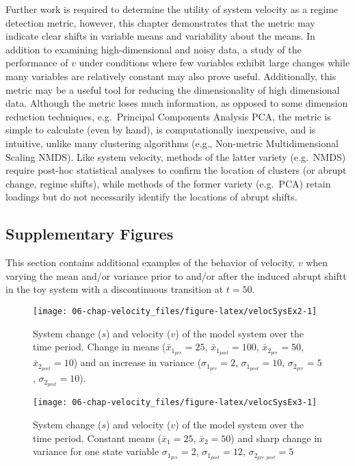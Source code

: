 \documentclass[]{article}
\begin{document}
Further work is required to determine the utility of system velocity as
a regime detection metric, however, this chapter demonstrates that the
metric may indicate clear shifts in variable means and variability about
the means. In addition to examining high-dimensional and noisy data, a
study of the performance of \(v\) under conditions where few variables
exhibit large changes while many variables are relatively constant may
also prove useful. Additionally, this metric may be a useful tool for
reducing the dimensionality of high dimensional data. Although the
metric loses much information, as opposed to some dimension reduction
techniques, e.g.~Principal Components Analysis PCA, the metric is simple
to calculate (even by hand), is computationally inexpensive, and is
intuitive, unlike many clustering algorithms (e.g., Non-metric
Multidimensional Scaling NMDS). Like system velocity, methods of the
latter variety (e.g.~NMDS) require post-hoc statistical analyses to
confirm the location of clusters (or abrupt change, regime shifts),
while methods of the former variety (e.g.~PCA) retain loadings but do
not necessarily identify the locations of abrupt shifts.

\hypertarget{supplementary-figures}{%
\subsection{Supplementary Figures}\label{supplementary-figures}}

This section contains additional examples of the behavior of velocity,
\(v\) when varying the mean and/or variance prior to and/or after the
induced abrupt shiftt in the toy system with a discontinuous transition
at \(t=50\).

\begin{figure}

{\centering \texttt{[image: 06-chap-velocity\_files/figure-latex/velocSysEx2-1]} 

}

\caption{System change ($s$) and velocity ($v$) of the model system over the time period. Change in means ($\bar{x}_{1_{pre}}=25$, $\bar{x}_{1_{post}}=100$, $\bar{x}_{2_{pre}}=50$, $\bar{x}_{2_{post}}=10$) and an increase in variance ($\sigma_{1_{pre}}=2$, $\sigma_{1_{post}}=10$, $\sigma_{2_{pre}}=5$,  $\sigma_{2_{post}}=10$).}\label{fig:velocSysEx2}
\end{figure}

\begin{figure}

{\centering \texttt{[image: 06-chap-velocity\_files/figure-latex/velocSysEx3-1]} 

}

\caption{System change ($s$) and velocity ($v$) of the model system over the time period. Constant means ($\bar{x}_1=25$, $\bar{x}_2=50$) and sharp change in variance for one state variable $\sigma_{1_{pre}} = 2$, $\sigma_{1_{post}} = 12$, $\sigma_{2_{pre,post}} = 5$}\label{fig:velocSysEx3}
\end{figure}
\end{document}
